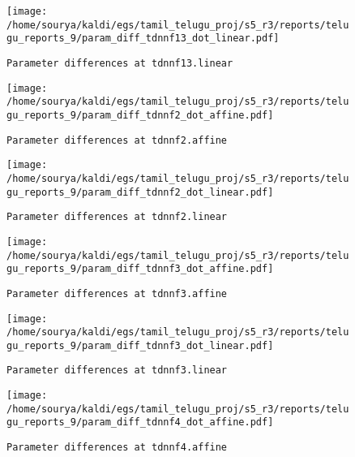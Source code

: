 \documentclass[prl,10pt,twocolumn]{revtex4}
\begin{document}
\newpage
\begin{figure}[h]
  \begin{center}
    \caption{\texttt{Parameter differences at tdnnf13.linear}}
    \texttt{[image: /home/sourya/kaldi/egs/tamil\_telugu\_proj/s5\_r3/reports/telugu\_reports\_9/param\_diff\_tdnnf13\_dot\_linear.pdf]}
  \end{center}
\end{figure}
\clearpage


\newpage
\begin{figure}[h]
  \begin{center}
    \caption{\texttt{Parameter differences at tdnnf2.affine}}
    \texttt{[image: /home/sourya/kaldi/egs/tamil\_telugu\_proj/s5\_r3/reports/telugu\_reports\_9/param\_diff\_tdnnf2\_dot\_affine.pdf]}
  \end{center}
\end{figure}
\clearpage


\newpage
\begin{figure}[h]
  \begin{center}
    \caption{\texttt{Parameter differences at tdnnf2.linear}}
    \texttt{[image: /home/sourya/kaldi/egs/tamil\_telugu\_proj/s5\_r3/reports/telugu\_reports\_9/param\_diff\_tdnnf2\_dot\_linear.pdf]}
  \end{center}
\end{figure}
\clearpage


\newpage
\begin{figure}[h]
  \begin{center}
    \caption{\texttt{Parameter differences at tdnnf3.affine}}
    \texttt{[image: /home/sourya/kaldi/egs/tamil\_telugu\_proj/s5\_r3/reports/telugu\_reports\_9/param\_diff\_tdnnf3\_dot\_affine.pdf]}
  \end{center}
\end{figure}
\clearpage


\newpage
\begin{figure}[h]
  \begin{center}
    \caption{\texttt{Parameter differences at tdnnf3.linear}}
    \texttt{[image: /home/sourya/kaldi/egs/tamil\_telugu\_proj/s5\_r3/reports/telugu\_reports\_9/param\_diff\_tdnnf3\_dot\_linear.pdf]}
  \end{center}
\end{figure}
\clearpage


\newpage
\begin{figure}[h]
  \begin{center}
    \caption{\texttt{Parameter differences at tdnnf4.affine}}
    \texttt{[image: /home/sourya/kaldi/egs/tamil\_telugu\_proj/s5\_r3/reports/telugu\_reports\_9/param\_diff\_tdnnf4\_dot\_affine.pdf]}
  \end{center}
\end{figure}
\clearpage
\end{document}
